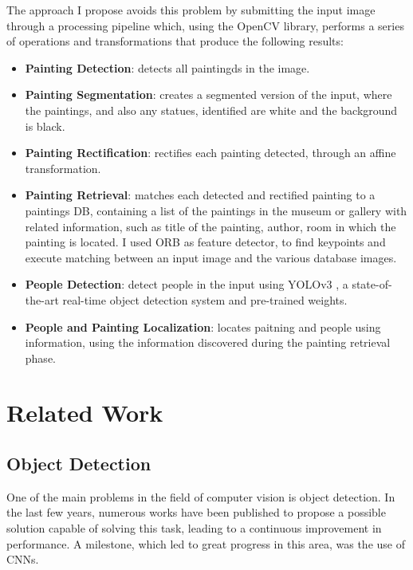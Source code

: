 \documentclass[10pt,twocolumn,letterpaper]{article}
\begin{document}
The approach I propose avoids this problem by submitting the input image through a processing pipeline which, using the OpenCV \cite{bradski2008learning} library, performs a series of operations and transformations that produce the following results:
\begin{itemize}
   \item \textbf{Painting Detection}: detects all paintingds in the image.
   \item \textbf{Painting Segmentation}: creates a segmented version of the input, where the paintings, and also any statues, identified are white and the background is black.
   \item \textbf{Painting Rectification}: rectifies each painting detected, through an affine transformation.
   \item \textbf{Painting Retrieval}: matches each detected and rectified painting to a paintings DB, containing a list of the paintings in the museum or gallery with related information, such as title of the painting, author, room in which the painting is located. I used ORB \cite{rublee2011orb} as feature detector, to find keypoints and execute matching between an input image and the various database images.
   \item \textbf{People Detection}: detect people in the input using YOLOv3 \cite{redmon2018yolov3}, a state-of-the-art real-time object detection system and pre-trained weights.
   \item \textbf{People and Painting Localization}: locates paitning and people using information, using the information discovered during the painting retrieval phase.
\end{itemize} 

\section{Related Work}

\subsection{Object Detection}

One of the main problems in the field of computer vision is object detection. In the last few years, numerous works have been published to propose a possible solution capable of solving this task, leading to a continuous improvement in performance. A milestone, which led to great progress in this area, was the use of CNNs.
\end{document}
